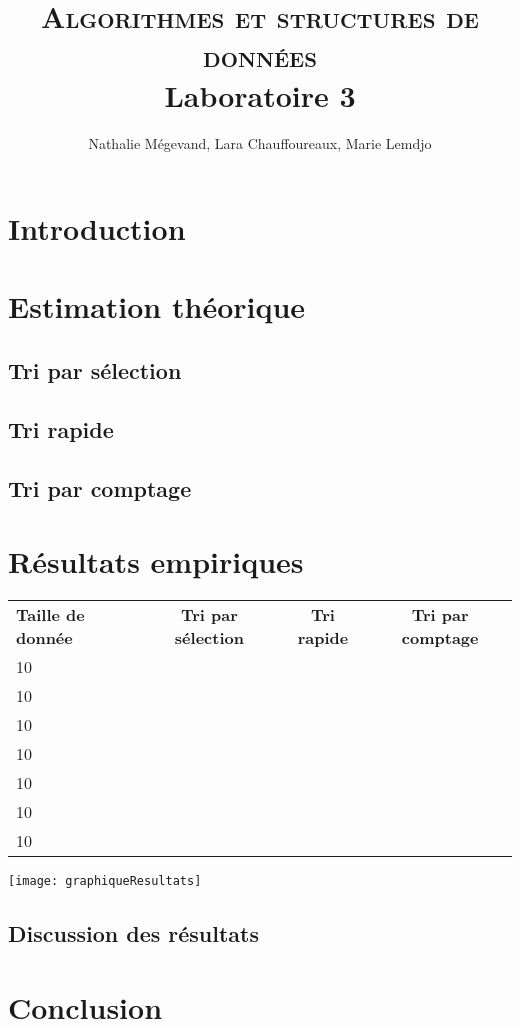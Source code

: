 \documentclass[11pt]{article}
\title{\vspace{-8mm}\textsc{\huge Algorithmes et structures de données}\\ 
 \large{ Laboratoire 3\\}
\vspace{-1 em}
}
\author{Nathalie Mégevand, Lara Chauffoureaux, Marie Lemdjo}
\begin{document}
\maketitle
\thispagestyle{fancy}

\section*{Introduction}


\section*{Estimation théorique}



\subsection*{Tri par sélection}



\subsection*{Tri rapide}


\subsection*{ Tri par comptage}



\section*{Résultats empiriques}

\begin{tabular}{|l|c|c|c|}
\hline
\textbf{Taille de donnée} & \textbf{Tri par sélection} & \textbf{Tri rapide}&  \textbf{Tri par comptage} \\
10\up{1} & & &  \\
10\up{2} & & &  \\
10\up{3} & & &  \\
10\up{4} & & &  \\
10\up{5} & & &  \\
10\up{6} & & &  \\
10\up{7} & & &  \\

\hline

\end{tabular}

\noindent\texttt{[image: graphiqueResultats]}



\subsection*{Discussion des résultats}



\section*{Conclusion}
\end{document}
